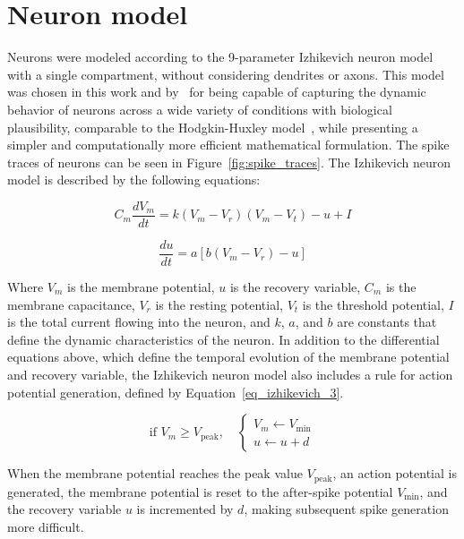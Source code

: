 

\section{Neuron model}

Neurons were modeled according to the 9-parameter Izhikevich neuron model~\parencite[cap.~8]{izhikevichDynamical2006} with a single
compartment, without considering dendrites or axons. This model was chosen in this work and by~\textcite{wheelerHippocampomeorg2023}
for being capable of capturing the dynamic behavior of neurons across a wide variety of conditions with biological plausibility,
comparable to the Hodgkin-Huxley model~\parencite{hodgkinQuantitative1952b}, while presenting a simpler and computationally more
efficient mathematical formulation. The spike traces of neurons can be seen in Figure~\ref{fig:spike_traces}. The Izhikevich
neuron model is described by the following equations:


\begin{equation}
\label{eq_izhikevich_1}
C_m \frac{dV_m}{dt} = k (V_m - V_r)(V_m - V_t) - u + I
\end{equation}

\begin{equation}
\label{eq_izhikevich_2}
\frac{du}{dt} = a [b(V_m-V_r) - u]
\end{equation}

Where $V_m$ is the membrane potential, $u$ is the recovery variable, $C_m$ is the membrane capacitance, $V_r$ is the resting
potential, $V_t$ is the threshold potential, $I$ is the total current flowing into the neuron, and $k$, $a$, and $b$ are
constants that define the dynamic characteristics of the neuron. In addition to the differential equations above, which define
the temporal evolution of the membrane potential and recovery variable, the Izhikevich neuron model also includes a rule for
action potential generation, defined by Equation~\ref{eq_izhikevich_3}.

\begin{equation}
\label{eq_izhikevich_3}
\text{if } V_m \geq V_{\text{peak}}, \quad
\begin{cases}
V_m \gets V_{\min} \\
u \gets u + d
\end{cases}
\end{equation}

When the membrane potential reaches the peak value $V_{\text{peak}}$, an action potential is generated, the membrane potential
is reset to the after-spike potential $V_{\min}$, and the recovery variable $u$ is incremented by $d$, making subsequent spike
generation more difficult.


